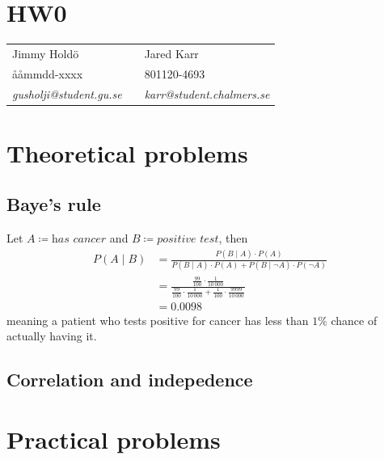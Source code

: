 \documentclass[a4paper,11pt]{article}
\DeclareMathOperator{\given}{\mid}
\begin{document}
\section*{HW0}

\begin{tabular*}{0.9\textwidth}{@{\extracolsep{\fill} } lll}
Jimmy Hold\"{o} & & Jared Karr\\
\aa\aa mmdd-xxxx & & 801120-4693\\
\it{gusholji@student.gu.se} & & \it{karr@student.chalmers.se}\\
\end{tabular*}

\section{Theoretical problems}
\subsection{Baye's rule}
Let $A\coloneqq\textit{has cancer}$ and $B\coloneqq\textit{positive test}$, then
\begin{align*}
P(A \given B) &= \frac{P(B \given A)\cdot P(A)}{P(B \given A)\cdot P(A)+P(B \given \neg A)\cdot P(\neg A)}  \\
              &= \frac{\frac{99}{100}\cdot\frac{1}{10\,000}}{\frac{99}{100}\cdot\frac{1}{10\,000}+\frac{1}{100}\cdot\frac{9999}{10\,000}} \\
              &= 0.0098
\end{align*}
meaning a patient who tests positive for cancer has less than $1\%$ chance of actually having it.

\subsection{Correlation and indepedence}
\clearpage
\section{Practical problems}
\end{document}
